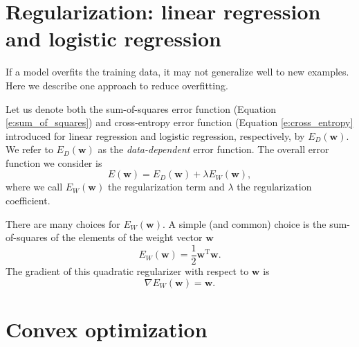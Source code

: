 \documentclass[11pt]{amsart}
\theoremstyle{definition}
\theoremstyle{remark}
\newcommand{\vect}[1]{\mathbf{#1}}
\newcommand{\transpose}{\text{T}}
\begin{document}
\section{Regularization: linear regression and logistic regression}
    If a model overfits the training data, it may not generalize well to new examples. Here we describe one approach to reduce overfitting. 

    Let us denote both the sum-of-squares error function (Equation \ref{e:sum_of_squares}) and cross-entropy error function (Equation \ref{e:cross_entropy} introduced for linear regression and logistic regression, respectively, by $E_D(\vect{w})$. We refer to $E_D(\vect{w})$ as the \emph{data-dependent} error function. The overall error function we consider is
    \begin{equation*}
        E(\vect{w}) = E_D(\vect{w}) + \lambda E_W(\vect{w}),
    \end{equation*}
    where we call $E_W(\vect{w})$ the regularization term and $\lambda$ the regularization coefficient. 

    There are many choices for $E_W(\vect{w})$. A simple (and common) choice is the sum-of-squares of the elements of the weight vector $\vect{w}$
    \begin{equation*}
        E_W(\vect{w}) = \frac{1}{2}\vect{w}^\transpose \vect{w}.
    \end{equation*}
    The gradient of this quadratic regularizer with respect to $\vect{w}$ is
    \begin{equation*}
        \nabla E_W(\vect{w}) = \vect{w}.
    \end{equation*}

\section{Convex optimization}
\end{document}
